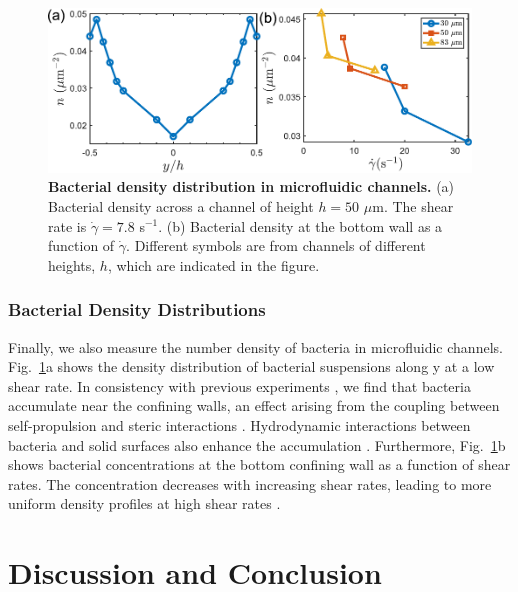 \begin{figure}[!ht]
	\begin{center}
	\includegraphics[width=5.5 in]{Figs/3-Rheo/5.pdf}
	\end{center}
	\caption[Bacterial Density Distribution in Microfluidic Channels]
	{
	\textbf{Bacterial density distribution in microfluidic channels.}
   (a) Bacterial density across a channel of height $h = 50$ $\mu$m. The shear rate is $\dot\gamma = 7.8$ s$^{-1}$. (b) Bacterial density at the bottom wall as a function of $\dot\gamma$. Different symbols are from channels of different heights, $h$, which are indicated in the figure.
	}
	\label{fig:3-density}
\end{figure}

\subsubsection{Bacterial Density Distributions}
Finally, we also measure the number density of bacteria in microfluidic channels. Fig.~\ref{fig:3-density}a shows the density distribution of bacterial suspensions along y at a low shear rate. In consistency with previous experiments \cite{Hill2007, Berke2008, Li2009}, we find that bacteria accumulate near the confining walls, an effect arising from the coupling between self-propulsion and steric interactions \cite{Ezhilan2015}. Hydrodynamic interactions between bacteria and solid surfaces also enhance the accumulation \cite{Berke2008}. Furthermore, Fig.~\ref{fig:3-density}b shows bacterial concentrations at the bottom confining wall as a function of shear rates. The concentration decreases with increasing shear rates, leading to more uniform density profiles at high shear rates \cite{Ezhilan2015}.


\section{Discussion and Conclusion}
